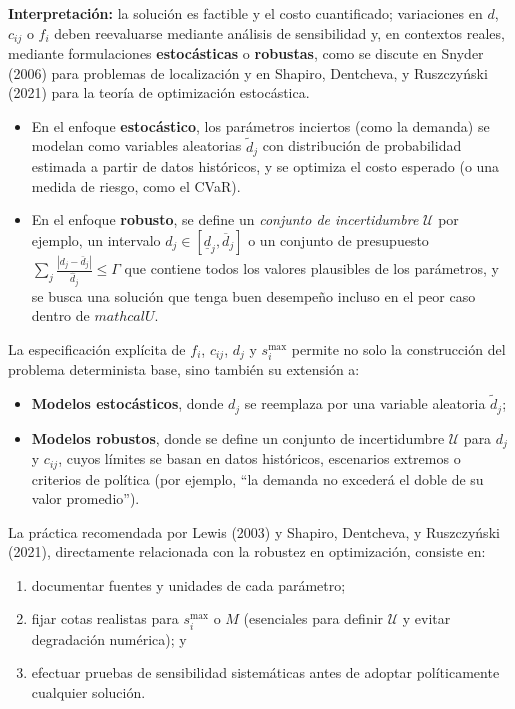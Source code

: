\documentclass[
  spanish,
  us-letterpaper,
]{scrreprt}
\providecommand{\tightlist}{%
  \setlength{\itemsep}{0pt}\setlength{\parskip}{0pt}}
\numberwithin{equation}{section}
\begin{document}
\textbf{Interpretación:} la solución es factible y el costo
cuantificado; variaciones en \(d\), \(c_{ij}\) o \(f_i\) deben
reevaluarse mediante análisis de sensibilidad y, en contextos reales,
mediante formulaciones \textbf{estocásticas} o \textbf{robustas}, como
se discute en Snyder (2006) para problemas de localización y en Shapiro,
Dentcheva, y Ruszczyński (2021) para la teoría de optimización
estocástica.

\begin{itemize}
\tightlist
\item
  En el enfoque \textbf{estocástico}, los parámetros inciertos (como la
  demanda) se modelan como variables aleatorias \(\tilde d_j\) con
  distribución de probabilidad estimada a partir de datos históricos, y
  se optimiza el costo esperado (o una medida de riesgo, como el
  CVaR).\\
\item
  En el enfoque \textbf{robusto}, se define un \emph{conjunto de
  incertidumbre} \(\mathcal{U}\) por ejemplo, un intervalo
  \(d_j \in [\underline{d}_j, \overline{d}_j]\) o un conjunto de
  presupuesto \(\sum_j \frac{|d_j - \bar d_j|}{\hat d_j} \leq \Gamma\)
  que contiene todos los valores plausibles de los parámetros, y se
  busca una solución que tenga buen desempeño incluso en el peor caso
  dentro de \(mathcal{U}\).
\end{itemize}

La especificación explícita de \(f_i\), \(c_{ij}\), \(d_j\) y
\(s_i^{\max}\) permite no solo la construcción del problema determinista
base, sino también su extensión a:

\begin{itemize}
\tightlist
\item
  \textbf{Modelos estocásticos}, donde \(d_j\) se reemplaza por una
  variable aleatoria \(\tilde d_j\);\\
\item
  \textbf{Modelos robustos}, donde se define un conjunto de
  incertidumbre \(\mathcal{U}\) para \(d_j\) y \(c_{ij}\), cuyos límites
  se basan en datos históricos, escenarios extremos o criterios de
  política (por ejemplo, ``la demanda no excederá el doble de su valor
  promedio'').
\end{itemize}

La práctica recomendada por Lewis (2003) y Shapiro, Dentcheva, y
Ruszczyński (2021), directamente relacionada con la robustez en
optimización, consiste en:

\begin{enumerate}
\def\labelenumi{(\roman{enumi})}
\tightlist
\item
  documentar fuentes y unidades de cada parámetro;\\
\item
  fijar cotas realistas para \(s_i^{\max}\) o \(M\) (esenciales para
  definir \(\mathcal{U}\) y evitar degradación numérica); y\\
\item
  efectuar pruebas de sensibilidad sistemáticas antes de adoptar
  políticamente cualquier solución.
\end{enumerate}
\end{document}
